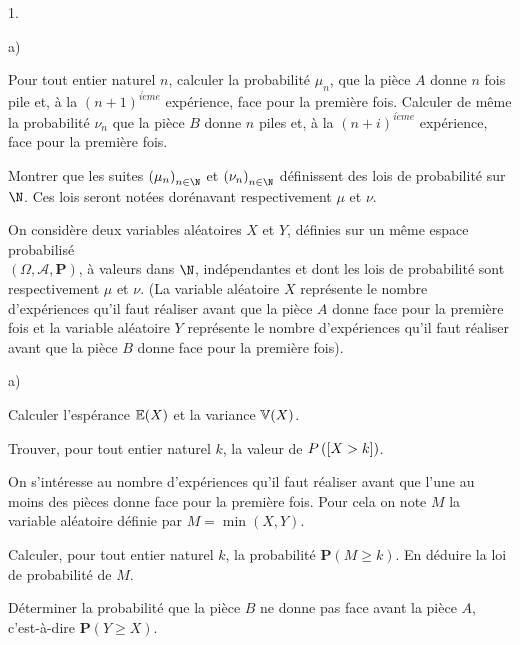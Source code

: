\documentclass[11pt]{article}%
\begin{document}
\begin{noliste}{1.}
 \setlength{\itemsep}{4mm}
\item 

\begin{noliste}{a)}
 \setlength{\itemsep}{2mm}
\item Pour tout entier naturel $n$, calculer la probabilité $\mu_{n}$,
que
la pièce $A$ donne $n$ fois pile et, à la $(n + 1)^{i\grave{e}me}$
expérience,
face pour la première fois. Calculer de même la probabilité $\nu_{n}$
que
la pièce $B$ donne $n$ piles et, à la $\left( n + i\right)
^{i\grave{e}me}$ expérience, face pour la première fois.

\item Montrer que les suites $\left( \mu_{n}\right)_{n\in \N}$ et
$\left( \nu_{n}\right)_{n\in \N}$ définissent des lois de probabilité
sur $\N$. Ces lois seront notées dorénavant respectivement $\mu $
et $\nu $.
\end{noliste}

\item On considère deux variables aléatoires $X$ et $Y$, définies sur
un même espace probabilisé \\
$\left( \Omega,\mathcal{A},\mathbf{P}\right) $, à valeurs dans $\N$,
indépendantes et dont les lois de probabilité sont respective\-ment
$\mu $
et $\nu $. (La variable aléatoire $X$ représente le nombre
d'expériences
qu'il faut réaliser avant que la pièce $A$ donne face pour la première
fois
et la variable aléatoire $Y$ représente le nombre d'expériences qu'il
faut réaliser avant que la pièce $B$ donne face pour la première fois).

\begin{noliste}{a)}
 \setlength{\itemsep}{2mm}
\item Calculer l'espérance $\mathbb{E}(X)$ et la variance $\mathbb{V}(X)$.

\item Trouver, pour tout entier naturel $k$, la valeur de
$P\left(\left[ {X>k} \right]\right)$.

\item On s'intéresse au nombre d'expériences qu'il faut réaliser avant
que
l'une au moins des pièces donne face pour la première fois. Pour cela
on
note $M$ la variable aléatoire définie par $M = \min \left(
X,Y\right).$

Calculer, pour tout entier naturel $k$, la probabilité
$\mathbf{P}\left(
M\geq k\right) $. En déduire la loi de probabilité de $M$.

\item Déterminer la probabilité que la pièce $B$ ne donne pas face
avant la
pièce $A$, c'est-à-dire $\mathbf{P}(Y\geq X)$.
\end{noliste}


\end{noliste}
\end{document}
